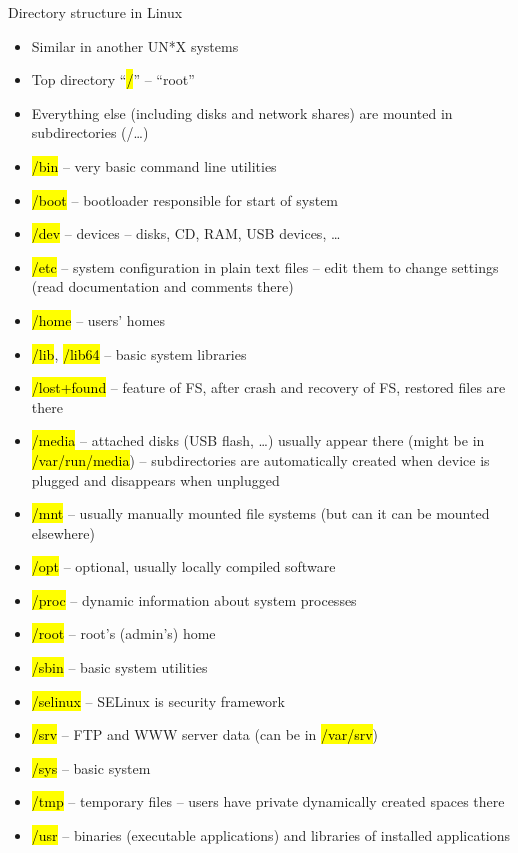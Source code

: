 \documentclass[compress, ucs, xelatex, 11pt, xcolor=svgnames,
  hyperref={
    bookmarks=true,
    unicode=true,
    colorlinks=true,
    pdftitle={Linux, command line and MetaCentrum},
    plainpages=false,
    pdfauthor={Vojtech Zeisek},
    pdfsubject={Course about use of Linux command line, writing shell scripts and using MetaCentrum of CESNET},
    pdfcreator={XeLaTeX},
    pdfkeywords={Linux, GNU, BASH, shell, command line, MetaCentrum},
    linkcolor=Red,
    anchorcolor=Blue,
    citecolor=Purple,
    filecolor=DodgerBlue,
    menucolor=DarkOrchid,
    urlcolor=DeepSkyBlue,
    pdftex},
  url={hyphens, lowtilde} %
  ]{beamer}
\renewcommand{\texttt}[1]{\hl{\ttfamily #1}}
\renewcommand{\alert}[1]{\textcolor{red}{#1}}
\begin{document}
\begin{frame}[allowframebreaks]{Directory structure in Linux}
\begin{itemize}
  \item Similar in another UN*X systems
  \item Top directory ``\texttt{/}'' -- ``root''
  \item Everything else (including disks and network shares) are mounted in subdirectories (/\ldots)
  \item \texttt{/bin} -- very basic command line utilities
  \item \texttt{/boot} -- bootloader responsible for start of system
  \item \texttt{/dev} -- devices -- disks, CD, RAM, USB devices, \ldots
  \item \alert{\texttt{/etc}} -- system configuration in plain text files -- edit them to change settings (read documentation and comments there)
  \item \alert{\texttt{/home}} -- users' homes
  \item \texttt{/lib}, \texttt{/lib64} -- basic system libraries
  \item \texttt{/lost+found} -- feature of FS, after crash and recovery of FS, restored files are there
  \item \alert{\texttt{/media}} -- attached disks (USB flash, \ldots) usually appear there (might be in \texttt{/var/run/media}) -- subdirectories are automatically created when device is plugged and disappears when unplugged
  \item \texttt{/mnt} -- usually manually mounted file systems (but can it can be mounted elsewhere)
  \item \texttt{/opt} -- optional, usually locally compiled software
  \item \texttt{/proc} -- dynamic information about system processes
  \item \texttt{/root} -- root's (admin's) home
  \item \texttt{/sbin} -- basic system utilities
  \item \texttt{/selinux} -- SELinux is security framework
  \item \texttt{/srv} -- FTP and WWW server data (can be in \texttt{/var/srv})
  \item \texttt{/sys} -- basic system
  \item \texttt{/tmp} -- temporary files -- users have private dynamically created spaces there
  \item \texttt{/usr} -- binaries (executable applications) and libraries of installed applications

\end{itemize}
\end{frame}
\end{document}

